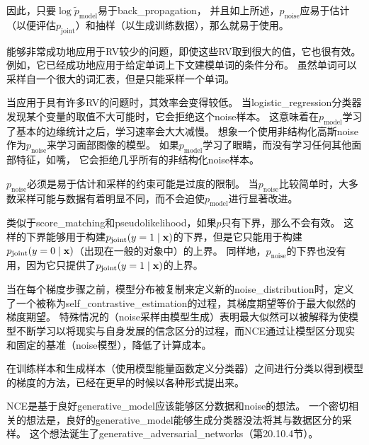 因此，只要$\log \tilde{p}_{\text{model}}$易于\gls{back_propagation}，
并且如上所述，$p_{\text{noise}}$应易于估计（以便评估$p_{\text{joint}}$）和抽样（以生成训练数据），那么就易于使用。


能够非常成功地应用于\gls{RV}较少的问题，即使这些\gls{RV}取到很大的值，它也很有效。
例如，它已经成功地应用于给定单词上下文建模单词的条件分布\citep{Mnih2013}。
虽然单词可以采样自一个很大的词汇表，但是只能采样一个单词。


当应用于具有许多\gls{RV}的问题时，其效率会变得较低。
当\gls{logistic_regression}分类器发现某个变量的取值不大可能时，它会拒绝这个\gls{noise}样本。
这意味着在$p_{\text{model}}$学习了基本的边缘统计之后，学习速率会大大减慢。
想象一个使用非结构化高斯\gls{noise}作为$p_{\text{noise}}$来学习面部图像的模型。
如果$p_{\text{model}}$学习了眼睛，而没有学习任何其他面部特征，如嘴， 它会拒绝几乎所有的非结构化\gls{noise}样本。


$p_{\text{noise}}$必须是易于估计和采样的约束可能是过度的限制。
当$p_{\text{noise}}$比较简单时，大多数采样可能与数据有着明显不同，而不会迫使$p_{\text{model}}$进行显著改进。


类似于\gls{score_matching}和\gls{pseudolikelihood}，如果$p$只有下界，那么不会有效。
这样的下界能够用于构建$p_{\text{joint}}( y = 1 \mid \mathbf{x})$的下界，但是它只能用于构建$p_{\text{joint}}(y = 0 \mid \mathbf{x})$（出现在一般的对象中）的上界。
同样地，$p_{\text{noise}}$的下界也没有用，因为它只提供了$p_{\text{joint}}( y = 1 \mid \mathbf{x})$的上界。


当在每个梯度步骤之前，模型分布被复制来定义新的\gls{noise_distribution}时，定义了一个被称为\gls{self_contrastive_estimation}的过程，其梯度期望等价于最大似然的梯度期望\citep{Goodfellow-ICLR2015}。
特殊情况的（\gls{noise}采样由模型生成）表明最大似然可以被解释为使模型不断学习以将现实与自身发展的信念区分的过程，而\gls{NCE}通过让模型区分现实和固定的基准（\gls{noise}模型），降低了计算成本。


在训练样本和生成样本（使用模型能量函数定义分类器）之间进行分类以得到模型的梯度的方法，已经在更早的时候以各种形式提出来\citep{Welling2003b,Bengio-2009-book}。


\gls{NCE}是基于良好\gls{generative_model}应该能够区分数据和\gls{noise}的想法。
一个密切相关的想法是，良好的\gls{generative_model}能够生成分类器没法将其与数据区分的采样。
这个想法诞生了\gls{generative_adversarial_networks}（第20.10.4节）。


